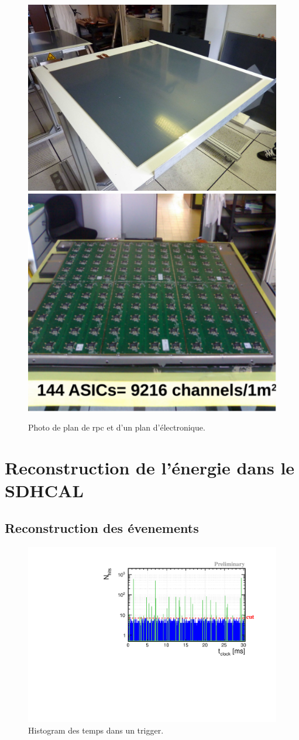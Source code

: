 \begin{figure}[!h]
  \begin{center}
    \includegraphics[width=.47\textwidth]{SDHCAL/figs/aLayer.jpg}
    \includegraphics[width=.4\textwidth]{SDHCAL/figs/layer_electronic2.pdf}
    \caption{Photo de plan de rpc et d'un plan d'électronique.}
    \label{fig:layer}
  \end{center}
\end{figure}


\section{Reconstruction de l'énergie dans le SDHCAL}

\subsection{Reconstruction des évenements}
\label{sec.trivent}
\begin{figure}[!h]
  \begin{center}
    \includegraphics[width=.8\textwidth]{SDHCAL/figs/time_spectrum.pdf}
    \caption{Histogram des temps dans un trigger.}
    \label{fig:time_spectrum}
  \end{center}
\end{figure}

